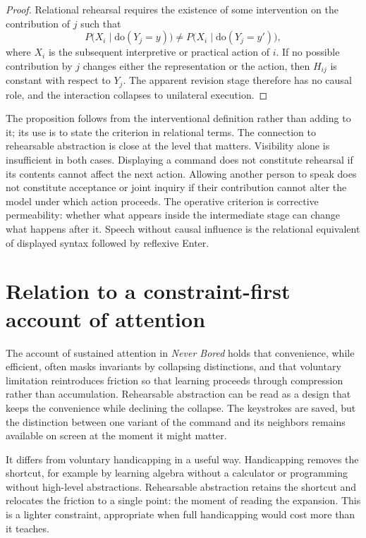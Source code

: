 \documentclass[11pt]{article}
\theoremstyle{remark}
\begin{document}
\begin{proof}
Relational rehearsal requires the existence of some intervention on the contribution of $j$ such that
\[
P\bigl(X_i\mid\mathrm{do}(Y_j=y)\bigr)
\neq
P\bigl(X_i\mid\mathrm{do}(Y_j=y')\bigr),
\]
where $X_i$ is the subsequent interpretive or practical action of $i$. If no possible contribution by $j$ changes either the representation or the action, then $H_{ij}$ is constant with respect to $Y_j$. The apparent revision stage therefore has no causal role, and the interaction collapses to unilateral execution.
\end{proof}

The proposition follows from the interventional definition rather than adding to it; its use is to state the criterion in relational terms. The connection to rehearsable abstraction is close at the level that matters. Visibility alone is insufficient in both cases. Displaying a command does not constitute rehearsal if its contents cannot affect the next action. Allowing another person to speak does not constitute acceptance or joint inquiry if their contribution cannot alter the model under which action proceeds. The operative criterion is corrective permeability: whether what appears inside the intermediate stage can change what happens after it. Speech without causal influence is the relational equivalent of displayed syntax followed by reflexive Enter.

\section{Relation to a constraint-first account of attention}

The account of sustained attention in \emph{Never Bored} holds that convenience, while efficient, often masks invariants by collapsing distinctions, and that voluntary limitation reintroduces friction so that learning proceeds through compression rather than accumulation. Rehearsable abstraction can be read as a design that keeps the convenience while declining the collapse. The keystrokes are saved, but the distinction between one variant of the command and its neighbors remains available on screen at the moment it might matter.

It differs from voluntary handicapping in a useful way. Handicapping removes the shortcut, for example by learning algebra without a calculator or programming without high-level abstractions. Rehearsable abstraction retains the shortcut and relocates the friction to a single point: the moment of reading the expansion. This is a lighter constraint, appropriate when full handicapping would cost more than it teaches.
\end{document}
